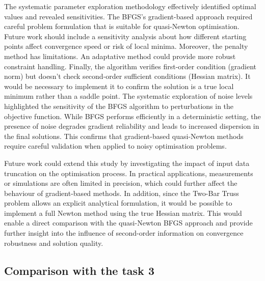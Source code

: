 The systematic parameter exploration methodology effectively identified optimal values and revealed sensitivities. The BFGS’s gradient-based approach required careful problem formulation that is suitable for quasi-Newton optimisation. \cite{fletcher1970, shanno1970, nocedalwright2006}
Future work should include a sensitivity analysis about how different starting points affect convergence speed or risk of local minima. Moreover, the penalty method has limitations. An adaptative method could provide more robust constraint handling. Finally, the algorithm verifies first-order condition (gradient norm) but doesn’t check second-order sufficient conditions (Hessian matrix). It would be necessary to implement it to confirm the solution is a true local minimum rather than a saddle point.
The systematic exploration of noise levels highlighted the sensitivity of the BFGS algorithm to perturbations in the objective function. While BFGS performs efficiently in a deterministic setting, the presence of noise degrades gradient reliability and leads to increased dispersion in the final solutions. This confirms that gradient-based quasi-Newton methods require careful validation when applied to noisy optimisation problems.

Future work could extend this study by investigating the impact of input data truncation on the optimisation process. In practical applications, measurements or simulations are often limited in precision, which could further affect the behaviour of gradient-based methods. In addition, since the Two-Bar Truss problem allows an explicit analytical formulation, it would be possible to implement a full Newton method using the true Hessian matrix. This would enable a direct comparison with the quasi-Newton BFGS approach and provide further insight into the influence of second-order information on convergence robustness and solution quality.

\subsection{Comparison with the task 3}

\begin{table}[H]
	\centering
	\caption{Results (rounded to four decimal) comparison \cite{task3report} (see section 3.2)}
\end{table}

